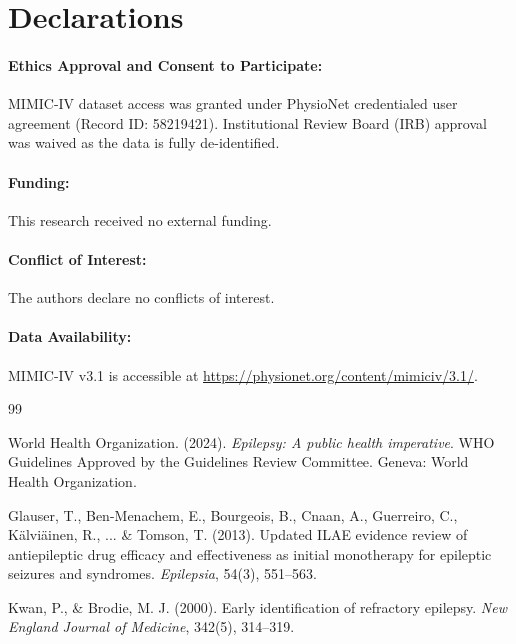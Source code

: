 \documentclass[11pt,a4paper]{article}
\begin{document}
\begin{table}[t]
\section*{Declarations}

\paragraph{Ethics Approval and Consent to Participate:}
MIMIC-IV dataset access was granted under PhysioNet credentialed user agreement (Record ID: 58219421). Institutional Review Board (IRB) approval was waived as the data is fully de-identified.

\paragraph{Funding:}
This research received no external funding.

\paragraph{Conflict of Interest:}
The authors declare no conflicts of interest.

\paragraph{Data Availability:}
MIMIC-IV v3.1 is accessible at \url{https://physionet.org/content/mimiciv/3.1/}.

\begin{thebibliography}{99}

World Health Organization. (2024). \emph{Epilepsy: A public health imperative}. WHO Guidelines Approved by the Guidelines Review Committee. Geneva: World Health Organization.

Glauser, T., Ben-Menachem, E., Bourgeois, B., Cnaan, A., Guerreiro, C., Kälviäinen, R., ... \& Tomson, T. (2013). Updated ILAE evidence review of antiepileptic drug efficacy and effectiveness as initial monotherapy for epileptic seizures and syndromes. \emph{Epilepsia}, 54(3), 551--563.

Kwan, P., \& Brodie, M. J. (2000). Early identification of refractory epilepsy. \emph{New England Journal of Medicine}, 342(5), 314--319.


\end{thebibliography}
\end{table}
\end{document}
